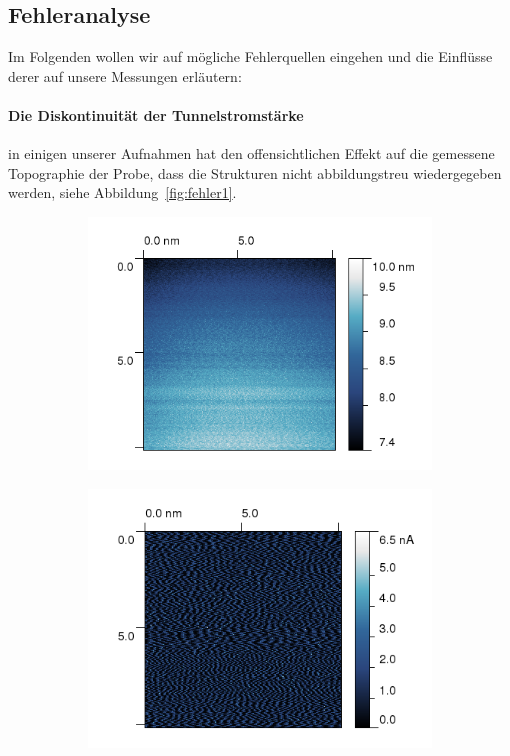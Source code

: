 \subsection{Fehleranalyse}
Im Folgenden wollen wir auf mögliche Fehlerquellen eingehen und die Einflüsse derer
auf unsere Messungen erläutern:
\paragraph{Die Diskontinuität der Tunnelstromstärke} in einigen unserer Aufnahmen hat den
offensichtlichen Effekt auf die gemessene Topographie der Probe, dass die Strukturen nicht
abbildungstreu wiedergegeben werden, siehe Abbildung~\ref{fig:fehler1}. 

\begin{figure}[h]
    \begin{subfigure}[b]{\picwidth}
    \includegraphics[width=\textwidth]{pics/fehler1a}
    \end{subfigure}\qquad
    \begin{subfigure}[b]{\picwidth}
        \includegraphics[width=\textwidth]{pics/fehler1b}

\end{subfigure}
\end{figure}
